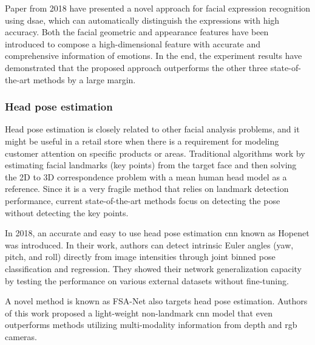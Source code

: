             Paper \cite{zeng2018facial} from 2018 have presented a novel approach for facial expression recognition using \gls{dsae}, which can automatically distinguish the expressions with high accuracy. Both the facial geometric and appearance features have been introduced to compose a high-dimensional feature with accurate and comprehensive information of emotions. In the end, the experiment results have demonstrated that the proposed approach outperforms the other three state-of-the-art methods by a large margin.
             
        \subsubsection{Head pose estimation}
            Head pose estimation is closely related to other facial analysis problems, and it might be useful in a retail store when there is a requirement for modeling customer attention on specific products or areas. Traditional algorithms work by estimating facial landmarks (key points) from the target face and then solving the 2D to 3D correspondence problem with a mean human head model as a reference. Since it is a very fragile method that relies on landmark detection performance, current state-of-the-art methods focus on detecting the pose without detecting the key points. 
            
            In 2018, an accurate and easy to use head pose estimation \gls{cnn} known as Hopenet \cite{Ruiz_2018_CVPR_Workshops} was introduced. In their work, authors can detect intrinsic Euler angles (yaw, pitch, and roll) directly from image intensities through joint binned pose classification and regression. They showed their network generalization capacity by testing the performance on various external datasets without fine-tuning. 
        
            A novel method is known as FSA-Net \cite{fsanet} also targets head pose estimation. Authors of this work proposed a light-weight non-landmark \gls{cnn} model that even outperforms methods utilizing multi-modality information from depth and \gls{rgb} cameras.
